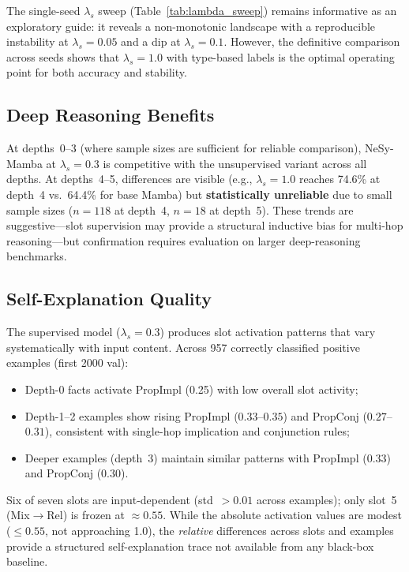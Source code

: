 \documentclass[conference]{IEEEtran}
\DeclareRobustCommand{\model}{NeSy-Mamba}
\begin{document}
The single-seed $\lambda_s$ sweep (Table~\ref{tab:lambda_sweep})
remains informative as an exploratory guide: it reveals a
non-monotonic landscape with a reproducible instability at
$\lambda_s{=}0.05$ and a dip at $\lambda_s{=}0.1$.  However,
the definitive comparison across seeds shows that
$\lambda_s{=}1.0$ with type-based labels is the optimal
operating point for both accuracy and stability.

\subsection{Deep Reasoning Benefits}

At depths~0--3 (where sample sizes are sufficient for
reliable comparison), \model{} at $\lambda_s{=}0.3$ is
competitive with the unsupervised variant across all depths.
At depths~4--5, differences are visible (e.g.,
$\lambda_s{=}1.0$ reaches 74.6\% at depth~4 vs.\ 64.4\% for
base Mamba) but \textbf{statistically unreliable} due to small
sample sizes ($n{=}118$ at depth~4, $n{=}18$ at depth~5).
These trends are suggestive---slot supervision may provide a
structural inductive bias for multi-hop reasoning---but
confirmation requires evaluation on larger deep-reasoning
benchmarks.

\subsection{Self-Explanation Quality}

The supervised model ($\lambda_s{=}0.3$) produces slot
activation patterns that vary systematically with input
content.  Across 957 correctly classified positive examples
(first 2000 val):
\begin{itemize}[nosep]
    \item Depth-0 facts activate PropImpl (0.25) with low
          overall slot activity;
    \item Depth-1--2 examples show rising PropImpl ($0.33$--$0.35$)
          and PropConj ($0.27$--$0.31$), consistent with
          single-hop implication and conjunction rules;
    \item Deeper examples (depth~3) maintain similar patterns
          with PropImpl (0.33) and PropConj (0.30).
\end{itemize}
Six of seven slots are input-dependent (std~$>0.01$ across
examples); only slot~5 (Mix$\to$Rel) is frozen at $\approx 0.55$.
While the absolute activation values are modest ($\leq 0.55$,
not approaching 1.0), the \emph{relative} differences across
slots and examples provide a structured self-explanation trace
not available from any black-box baseline.
\end{document}
